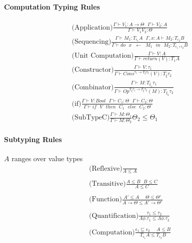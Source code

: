 \documentclass[twoside,a4paper,11pt]{article}
\newcommand{\s}{\mbox{ }}
\newcommand{\subtype}{\leq}
\newcommand{\subeffect}{\sqsubseteq}
\newcommand{\typeJudgement}[2]{\Gamma\vdash #1 \colon #2}
\newcommand{\modVarTypeJudgement}[3]{\Gamma, #1 \vdash #2 \colon #3}
\newcommand{\conditionalTypeRule}[4]{\typeRule{#1}{#2}{#3} #4}
\newcommand{\typeRule}[3]{\displaystyle\mbox{#1}\frac{#2}{#3}}
\begin{document}
\paragraph{Computation Typing Rules}

\[\begin{array}{c}
\typeRule{(Application)}{\typeJudgement{V_1}{A \rightarrow \Theta}\s\typeJudgement{V_2}{A}}{\typeJudgement{V_1 V_2}{\Theta}}
\\
\typeRule{(Sequencing)}{\typeJudgement{M_1}{T_{\epsilon_1} A}\s\modVarTypeJudgement{x: A}{M_2}{T_{\epsilon_2} B}}{\typeJudgement{do \s x \s \leftarrow \s M_1 \s in \s M_2}{T_{\epsilon_1 \circ \epsilon_2} B}}
\\
\typeRule{(Unit Computation)}{\typeJudgement{V}{A}}{\typeJudgement{return(V)}{T_{1}A}}
\\
\typeRule{(Constructor)}{\typeJudgement{V}{\tau_1}}{\typeJudgement{ Cons^{\tau_1 \rightarrow T_{\xi} \tau_2}(V)}{T_{\xi} \tau_2}}
\\
\typeRule{(Combinator)}{\typeJudgement{M}{{T_{\xi_1} \tau_1}}}{\typeJudgement{ Op^{T_{\xi} \tau_1 \rightarrow T_{\xi} \tau_2}(M)}{{T_{\xi_2} \tau_2}}}
\\
\typeRule{(if)}{\typeJudgement{V}{Bool}\s\typeJudgement{C_1}{\Theta}\s\typeJudgement{C_2}{\Theta}}{\typeJudgement{if\s V\s then\s C_1\s else \s C_2}{\Theta}}
\\
\conditionalTypeRule{(SubTypeC)}{\typeJudgement{M}{\Theta_1}}{\typeJudgement{M}{\Theta_2}}{\Theta_2 \subtype \Theta_1}
\end{array}\]

\paragraph{Subtyping Rules}

$A$ ranges over value types
\[\begin{array}{c}

\typeRule{(Reflexive)}{}{A \subtype A}
\\
\\
\typeRule{(Transitive)}{A \subtype B\s B\subtype C}{A \subtype C}
\\
\\
\typeRule{(Function)}{A' \subtype A \s\s \Theta\subtype \Theta'}{A \rightarrow \Theta \subtype A' \rightarrow \Theta'}
\\
\\
\typeRule{(Quantification)}{\tau_1 \subtype \tau_2}{\Lambda \phi. \tau_1 \subtype \Lambda \phi. \tau_2}
\\
\\
\typeRule{(Computation)}{\epsilon_1 \subeffect \epsilon_2\s\s A \subtype B}{T_{\epsilon_1} A \subtype T_{\epsilon_2} B}

\end{array}\]
\end{document}
